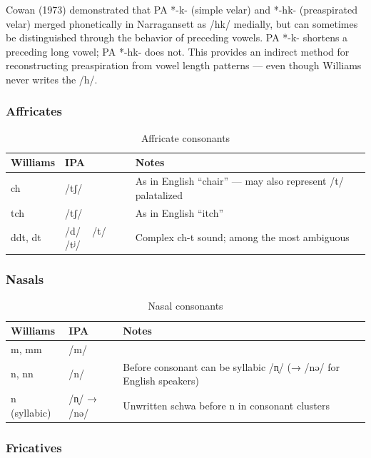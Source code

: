 Cowan (1973) demonstrated that PA *-k- (simple velar) and *-hk- (preaspirated
velar) merged phonetically in Narragansett as /hk/ medially, but can sometimes
be distinguished through the behavior of preceding vowels. PA *-k- shortens a
preceding long vowel; PA *-hk- does not. This provides an indirect method for
reconstructing preaspiration from vowel length patterns --- even though
Williams never writes the /h/.

\subsubsection{Affricates}

\begin{table}[h]
\centering
\begin{tabular}{lll}
\toprule
Williams & IPA & Notes \\
\midrule
ch & /tʃ/ & As in English ``chair'' --- may also represent /t/ palatalized \\
tch & /tʃ/ & As in English ``itch'' \\
ddt, dt & /d/ ~ /t/ ~ /tʲ/ & Complex ch-t sound; among the most ambiguous \\
\bottomrule
\end{tabular}
\caption{Affricate consonants}
\label{tab:1362-affricates}
\end{table}

\subsubsection{Nasals}

\begin{table}[h]
\centering
\begin{tabular}{lll}
\toprule
Williams & IPA & Notes \\
\midrule
m, mm & /m/ & \\
n, nn & /n/ & Before consonant can be syllabic /n̩/ (→ /nə/ for English speakers) \\
n (syllabic) & /n̩/ → /nə/ & Unwritten schwa before n in consonant clusters \\
\bottomrule
\end{tabular}
\caption{Nasal consonants}
\label{tab:1362-nasals}
\end{table}

\subsubsection{Fricatives}

